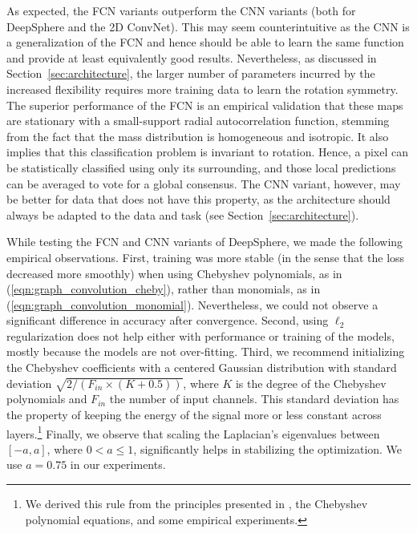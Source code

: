 \documentclass[final,twocolumn,3p,times,sort&compress]{elsarticle}
\newcommand{\secref}[1]{Section~\ref{sec:#1}}
\newcommand{\eqnref}[1]{(\ref{eqn:#1})}
\newcommand{\1}{\b{1}}              %
\newcommand{\0}{\b{0}}              %
\begin{document}
As expected, the FCN variants outperform the CNN variants (both for DeepSphere and the 2D ConvNet).
This may seem counterintuitive as the CNN is a generalization of the FCN and hence should be able to learn the same function and provide at least equivalently good results.
Nevertheless, as discussed in \secref{architecture}, the larger number of parameters incurred by the increased flexibility requires more training data to learn the rotation symmetry.
The superior performance of the FCN is an empirical validation that these maps are stationary with a small-support radial autocorrelation function, stemming from the fact that the mass distribution is homogeneous and isotropic.
It also implies that this classification problem is invariant to rotation.
Hence, a pixel can be statistically classified using only its surrounding, and those local predictions can be averaged to vote for a global consensus.
The CNN variant, however, may be better for data that does not have this property, as the architecture should always be adapted to the data and task (see \secref{architecture}).

While testing the FCN and CNN variants of DeepSphere, we made the following empirical observations.
First, training was more stable (in the sense that the loss decreased more smoothly) when using Chebyshev polynomials, as in \eqnref{graph_convolution_cheby}, rather than monomials, as in \eqnref{graph_convolution_monomial}.
Nevertheless, we could not observe a significant difference in accuracy after convergence.
Second, using $\ell_2$ regularization does not help either with performance or training of the models, mostly because the models are not over-fitting.
Third, we recommend initializing the Chebyshev coefficients with a centered Gaussian distribution with standard deviation $\sqrt{2/(F_{in} \times (K + 0.5))}$, where $K$ is the degree of the Chebyshev polynomials and $F_{in}$ the number of input channels.
This standard deviation has the property of keeping the energy of the signal more or less constant across layers.\footnote{We derived this rule from the principles presented in \cite{glorot2010understanding}, the Chebyshev polynomial equations, and some empirical experiments.}
Finally, we observe that scaling the Laplacian's eigenvalues between $[-a, a]$, where $0 < a \leq 1$, significantly helps in stabilizing the optimization. We use $a = 0.75$ in our experiments.
\end{document}
